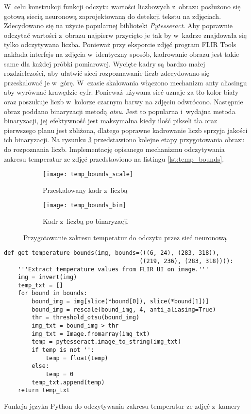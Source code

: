 W~celu konstrukcji funkcji odczytu wartości liczbowych z~obrazu posłużono
się gotową siecią neuronową zaprojektowaną do detekcji tekstu na zdjęciach.
Zdecydowano się na użycie popularnej biblioteki \emph{Pytesseract}.
Aby poprawnie odczytać wartości z~obrazu najpierw przycięto je tak by w~kadrze
znajdowała się tylko odczytywana liczba.
Ponieważ przy eksporcie zdjęć program FLIR Tools nakłada interfejs na zdjęcia
w~identyczny sposób, kadrowanie obrazu jest takie same dla każdej próbki
pomiarowej.
Wycięte kadry są bardzo małej rozdzielczości, aby ułatwić sieci rozpoznawanie
liczb zdecydowano się przeskalować je w~górę.
W~czasie skalowania włączono mechanizm anty aliasingu aby wyrównać krawędzie
cyfr.
Ponieważ używana sieć uznaje za tło kolor biały oraz poszukuje liczb w~kolorze
czarnym barwy na zdjęciu odwrócono.
Następnie obraz poddano binaryzacji metodą \emph{otsu}.
Jest to popularna i~wydajna metoda binaryzacji, jej efektywność jest
maksymalna kiedy ilość pikseli tła oraz pierwszego planu jest zbliżona,
dlatego poprawne kadrowanie liczb sprzyja jakości ich binaryzacji\cite{sezgin}.
Na rysunku \ref{fig:temp_bounds} przedstawiono kolejne etapy przygotowania
obrazu do rozpoznania liczb.
Implementację opisanego mechanizmu odczytywania zakresu temperatur ze zdjęć
przedstawiono na listingu \ref{lst:temp_bounds}.
\begin{figure}[htbp]
	\centering
	\begin{subfigure}{0.45\textwidth}
		\centering
		\texttt{[image: temp\_bounds\_scale]}
		\caption{Przeskalowany kadr z~liczbą}
		\label{fig:temp_bounds_scale}
	\end{subfigure}
	\hspace{0.5cm}
	\begin{subfigure}{0.45\textwidth}
		\centering
		\texttt{[image: temp\_bounds\_bin]}
		\caption{Kadr z~liczbą po binaryzacji}
		\label{fig:temp_bounds_bin}
	\end{subfigure}
	\caption{Przygotowanie zakresu temperatur do odczytu przez sieć neuronową}
	\label{fig:temp_bounds}
\end{figure}

\begin{listing}[htbp]
\begin{verbatim}
def get_temperature_bounds(img, bounds=(((6, 24), (283, 318)),
                                       ((219, 236), (283, 318)))):
    '''Extract temperature values from FLIR UI on image.'''
    img = invert(img)
    temp_txt = []
    for bound in bounds:
        bound_img = img[slice(*bound[0]), slice(*bound[1])]
        bound_img = rescale(bound_img, 4, anti_aliasing=True)
        thr = threshold_otsu(bound_img)
        img_txt = bound_img > thr
        img_txt = Image.fromarray(img_txt)
        temp = pytesseract.image_to_string(img_txt)
        if temp is not '': 
            temp = float(temp)
        else:
            temp = 0
        temp_txt.append(temp)
    return temp_txt
\end{verbatim}
\caption{Funkcja języka Python do odczytywania zakresu temperatur ze zdjęć
         z~kamery}
\label{lst:temp_bounds}
\end{listing}

